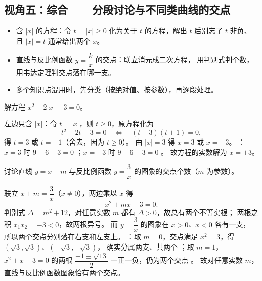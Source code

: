 \begin{explore}
\subsection{视角五：综合——分段讨论与不同类曲线的交点}

\begin{itemize}
  \item 含 $|x|$ 的方程：令 $t=|x|\geq0$ 化为关于 $t$ 的方程，解出 $t$ 后别忘了 $t$ 非负、
        且 $|x|=t$ 通常给出两个 $x$。
  \item 直线与反比例函数 $y=\dfrac{k}{x}$ 的交点：联立消元成二次方程，
        用判别式判个数，用韦达定理判交点落在哪一支。
  \item 多个知识点混用时，先分类（按绝对值、按参数），再逐段处理。
\end{itemize}

\begin{example}
解方程 $x^2-2|x|-3=0$。
\end{example}
\begin{solution}
左边只含 $|x|$：令 $t=|x|$，则 $t\geq0$，原方程化为
\[
  t^2-2t-3=0\quad\Longleftrightarrow\quad(t-3)(t+1)=0,
\]
得 $t=3$ 或 $t=-1$（舍去，因为 $t\geq0$）。
由 $|x|=3$ 得 $x=3$ 或 $x=-3$。
：$x=3$ 时 $9-6-3=0$ \checkmark；$x=-3$ 时 $9-6-3=0$ \checkmark。
故方程的实数解为 $x=\pm3$。
\end{solution}

\begin{problem}
讨论直线 $y=x+m$ 与反比例函数 $y=\dfrac3x$ 的图象的交点个数（$m$ 为参数）。
\end{problem}
\begin{solution}
联立 $x+m=\dfrac3x$（$x\neq0$），两边乘以 $x$ 得
\[
  x^2+mx-3=0.
\]
判别式 $\Delta=m^2+12$，对任意实数 $m$ 都有 $\Delta>0$，故总有两个不等实根；
两根之积 $x_1x_2=-3<0$，故两根异号。
而 $y=\dfrac3x$ 的图象在 $x>0$、$x<0$ 各有一支，
所以两个交点分别落在右支和左支上。
：取 $m=0$，交点满足 $x^2=3$，得 $(\sqrt3,\sqrt3)$、$(-\sqrt3,-\sqrt3)$，
确实分属两支、共两个 \checkmark；取 $m=1$，$x^2+x-3=0$ 的两根 $\dfrac{-1\pm\sqrt{13}}2$
一正一负，仍为两个交点 \checkmark。
故对任意实数 $m$，直线与反比例函数图象恰有两个交点。
\end{solution}
\end{explore}

